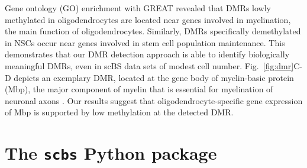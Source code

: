 \documentclass[twocolumn,10pt]{article}
\begin{document}
Gene ontology (GO) enrichment with GREAT \citep{mclean2010great} revealed that DMRs lowly methylated in oligodendrocytes are located near genes involved in myelination, the main function of oligodendrocytes.
Similarly, DMRs specifically demethylated in NSCs occur near genes involved in stem cell population maintenance.
This demonstrates that our DMR detection approach is able to identify biologically meaningful DMRs, even in scBS data sets of modest cell number.
Fig.~\ref{fig:dmr}C-D depicts an exemplary DMR, located at the gene body of myelin-basic protein (Mbp), the major component of myelin that is essential for myelination of neuronal axons \citep{mbp}.
Our results suggest that oligodendrocyte-specific gene expression of Mbp is supported by low methylation at the detected DMR.


\section{The \texttt{scbs} Python package}
\end{document}

